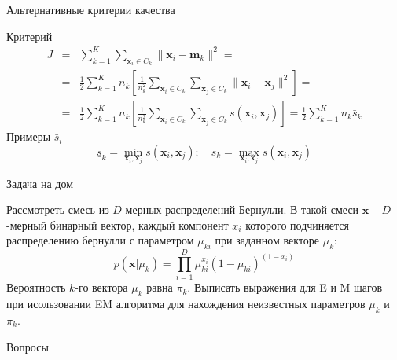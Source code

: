\documentclass[aspectratio=169]{beamer}
\begin{document}
\begin{frame}{Альтернативные критерии качества}

Критерий
\begin{eqnarray*}
J &=& \sum_{k=1}^K \sum_{\mathbf{x}_i \in C_k} \| \mathbf{x}_i - \mathbf{m}_k \|^2 = \\
&=& \frac 1 2 \sum_{k=1}^K n_k \left[ \frac{1}{n_k^2} \sum_{\mathbf{x}_i \in C_k} \sum_{\mathbf{x}_j \in C_k} \| \mathbf{x}_i - \mathbf{x}_j \|^2 \right] = \\
&=& \frac 1 2 \sum_{k=1}^K n_k \left[ \frac{1}{n_k^2} \sum_{\mathbf{x}_i \in C_k} \sum_{\mathbf{x}_j \in C_k} s(\mathbf{x}_i, \mathbf{x}_j) \right] = \frac 1 2 \sum_{k=1}^K n_k \bar s_k
\end{eqnarray*}
Примеры $\bar s_i$
\[
\underline{s}_k = \min_{\mathbf{x}_i, \mathbf{x}_j} s(\mathbf{x}_i, \mathbf{x}_j); \quad \bar s_k = \max_{\mathbf{x}_i, \mathbf{x}_j} s(\mathbf{x}_i, \mathbf{x}_j)\]

\end{frame}

\begin{frame}{Задача на дом}

Рассмотреть смесь из $D$-мерных распределений Бернулли. В такой смеси $\mathbf{x}$ -- $D$-мерный бинарный вектор, каждый компонент $x_i$ которого подчиняется распределению бернулли с параметром $\mu_{ki}$ при заданном векторе $\mu_k$:
\[
p(\mathbf{x} | \mu_k) = \prod_{i=1}^D \mu_{ki}^{x_i} (1-\mu_{ki})^{(1-x_i)}
\]
Вероятность $k$-го вектора $\mu_k$ равна $\pi_k$. Выписать выражения для E и M шагов при исользовании EM алгоритма для нахождения неизвестных параметров $\mu_k$ и $\pi_k$.

\end{frame}

\begin{frame}[plain]
\begin{center}
{\Large Вопросы}
\end{center}
\end{frame}
\end{document}
